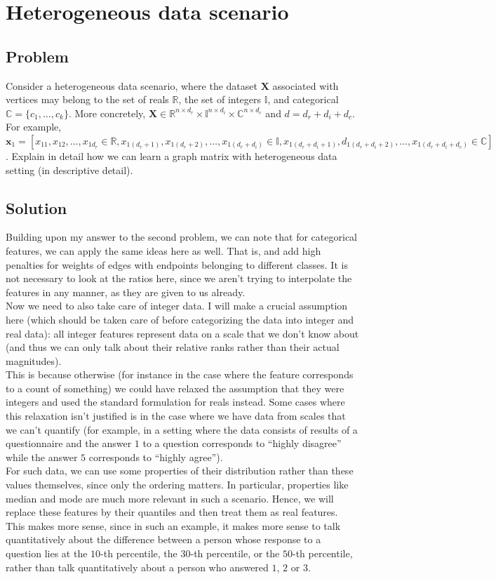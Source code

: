 \documentclass[a4paper]{article}
\newcommand{\nl}{\vspace{0.2cm}\\}
\newcommand{\mf}{\mathbf}
\newcommand{\mb}{\mathbb}
\newcommand{\R}{\mathbb{R}}
\begin{document}
\newpage

\section{Heterogeneous data scenario}

\subsection{Problem}

Consider a heterogeneous data scenario, where the dataset $\mf{X}$ associated with vertices may belong to the set of reals $\R$, the set of integers $\mb{I}$, and categorical $\mb{C} = \{c_1,
\ldots, c_k\}$. More concretely, $\mf{X} \in \R^{n \times d_r} \times \mb{I}^{n \times d_i} \times \mb{C}^{n \times d_c}$ and $d = d_r + d_i + d_c$. For example, $\mf{x}_1 = [x_{11}, x_{12},
\ldots, x_{1d_r} \in \R, x_{1(d_r + 1)}, x_{1(d_r + 2)}, \ldots, x_{1(d_r + d_i)} \in \mb{I}, x_{1(d_r + d_i + 1)}, d_{1(d_r + d_i + 2)}, \ldots, x_{1(d_r + d_i + d_c)} \in \mb{C}]$. Explain in
detail how we can learn a graph matrix with heterogeneous data setting (in descriptive detail).

\subsection{Solution}

Building upon my answer to the second problem, we can note that for categorical features, we can apply the same ideas here as well. That is,
and add high penalties for weights of edges with endpoints belonging to different classes. It is not necessary to look at the ratios here, since we aren't trying to interpolate the features in
any manner, as they are given to us already.\nl
Now we need to also take care of integer data. I will make a crucial
assumption here (which should be taken care of before categorizing the data into integer and real data): all integer features represent data on a scale that we don't know about (and thus we can only talk
about their relative ranks rather than their actual magnitudes).\nl
This is because otherwise (for instance in the case where the feature corresponds to a count of something) we could have relaxed the
assumption that they were integers and used the standard formulation for reals instead. Some cases where this relaxation isn't justified is in the case where we have data from scales that
we can't quantify (for example, in a setting where the data consists of results of a questionnaire and the answer $1$ to a question corresponds to ``highly disagree'' while the answer $5$
corresponds to ``highly agree'').\nl
For such data, we can use some properties of their distribution rather than these values themselves, since only the ordering matters. In particular, properties like median and mode are much
more relevant in such a scenario. Hence, we will replace these features by their quantiles and then treat them as real features. This makes more sense, since in such an example, it makes more
sense to talk quantitatively about the difference between a person whose
response to a question lies at the $10$-th percentile, the $30$-th percentile, or the $50$-th percentile, rather than talk quantitatively about a person who answered $1$, $2$ or $3$.\nl
\end{document}
